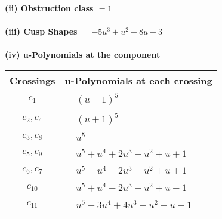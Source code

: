 \documentclass[1p]{elsarticle_modified}
\theoremstyle{definition}
\begin{document}
\flushleft \textbf{(ii) Obstruction class $= 1$}\\~\\
\flushleft \textbf{(iii) Cusp Shapes $= -5 u^3+u^2+8 u-3$}\\~\\
\newpage\renewcommand{\arraystretch}{1}
\flushleft \textbf{(iv) u-Polynomials at the component}\newline \\
\begin{tabular}{m{50pt}|m{274pt}}
Crossings & \hspace{64pt}u-Polynomials at each crossing \\
\hline $$\begin{aligned}c_{1}\end{aligned}$$&$\begin{aligned}
&(u-1)^5
\end{aligned}$\\
\hline $$\begin{aligned}c_{2},c_{4}\end{aligned}$$&$\begin{aligned}
&(u+1)^5
\end{aligned}$\\
\hline $$\begin{aligned}c_{3},c_{8}\end{aligned}$$&$\begin{aligned}
&u^5
\end{aligned}$\\
\hline $$\begin{aligned}c_{5},c_{9}\end{aligned}$$&$\begin{aligned}
&u^5+u^4+2 u^3+u^2+u+1
\end{aligned}$\\
\hline $$\begin{aligned}c_{6},c_{7}\end{aligned}$$&$\begin{aligned}
&u^5- u^4-2 u^3+u^2+u+1
\end{aligned}$\\
\hline $$\begin{aligned}c_{10}\end{aligned}$$&$\begin{aligned}
&u^5+u^4-2 u^3- u^2+u-1
\end{aligned}$\\
\hline $$\begin{aligned}c_{11}\end{aligned}$$&$\begin{aligned}
&u^5-3 u^4+4 u^3- u^2- u+1
\end{aligned}$\\
\hline
\end{tabular}\\~\\
\end{document}
